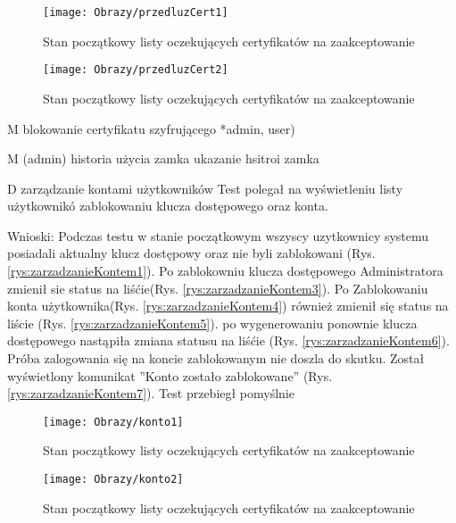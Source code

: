 \begin{enumerate*}
	
		\begin{figure}[ht!]
		
		\begin{minipage}{0.2\textwidth}
			\texttt{[image: Obrazy/przedluzCert1]}
			\caption{Stan początkowy listy oczekujących certyfikatów na zaakceptowanie }
			\label{rys:przedluzCert1}
		\end{minipage}
		
		\begin{minipage}{0.2\textwidth}
			\texttt{[image: Obrazy/przedluzCert2]}
			\caption{Stan początkowy listy oczekujących certyfikatów na zaakceptowanie }
			\label{rys:przedluzCert2}
		\end{minipage}
		
		
	
		
	\end{figure}
	
	
	\item M blokowanie certyfikatu szyfrującego *admin, user)
	\item M (admin) historia użycia zamka
	ukazanie hsitroi zamka
	\item D zarządzanie kontami użytkowników
		Test polegał na wyświetleniu listy użytkownikó zablokowaniu klucza dostępowego oraz konta.
		
		Wnioski: Podczas testu w stanie początkowym wszyscy uzytkownicy systemu posiadali aktualny klucz dostępowy oraz nie byli zablokowani (Rys. \ref{rys:zarzadzanieKontem1}). Po zablokowniu klucza dostępowego  Administratora zmienił sie status na liśćie(Rys. \ref{rys:zarzadzanieKontem3}). Po Zablokowaniu konta użytkownika(Rys. \ref{rys:zarzadzanieKontem4}) również zmienił się status na liście (Rys. \ref{rys:zarzadzanieKontem5}). po wygenerowaniu ponownie klucza dostępowego nastąpiła zmiana statusu na liśćie (Rys. \ref{rys:zarzadzanieKontem6}). Próba zalogowania się na koncie zablokowanym nie doszla do skutku. Został wyświetlony komunikat ''Konto zostało zablokowane'' (Rys. \ref{rys:zarzadzanieKontem7}). Test przebiegł pomyślnie
		
		
				\begin{figure}[ht!]
					\begin{minipage}{0.2\textwidth}
						\texttt{[image: Obrazy/konto1]}
						\caption{Stan początkowy listy oczekujących certyfikatów na zaakceptowanie }
						\label{rys:zarzadzanieKontem1}
					\end{minipage}
				\begin{minipage}{0.2\textwidth}
					\texttt{[image: Obrazy/konto2]}
					\caption{Stan początkowy listy oczekujących certyfikatów na zaakceptowanie }
					\label{rys:zarzadzanieKontem2}
				\end{minipage}
			

\end{figure}
\end{enumerate*}
